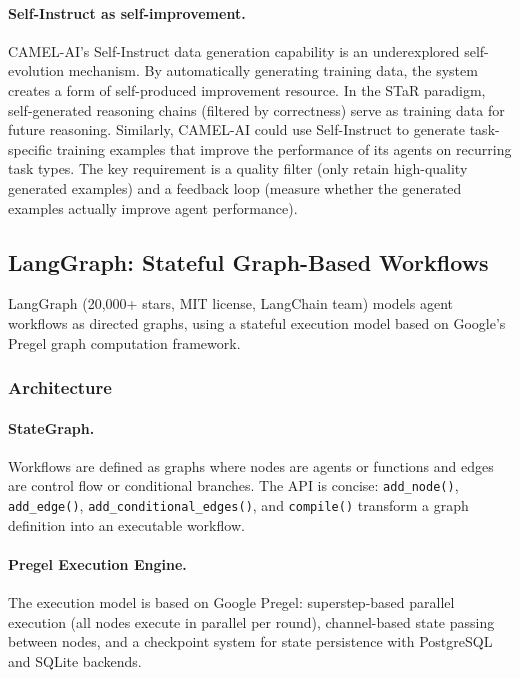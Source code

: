 \paragraph{Self-Instruct as self-improvement.}
CAMEL-AI's Self-Instruct data generation capability is an underexplored self-evolution mechanism. By automatically generating training data, the system creates a form of self-produced improvement resource. In the STaR paradigm, self-generated reasoning chains (filtered by correctness) serve as training data for future reasoning. Similarly, CAMEL-AI could use Self-Instruct to generate task-specific training examples that improve the performance of its agents on recurring task types. The key requirement is a quality filter (only retain high-quality generated examples) and a feedback loop (measure whether the generated examples actually improve agent performance).


\subsection{LangGraph: Stateful Graph-Based Workflows}

LangGraph (20,000+ stars, MIT license, LangChain team) models agent workflows as directed graphs, using a stateful execution model based on Google's Pregel graph computation framework.

\subsubsection{Architecture}

\paragraph{StateGraph.}
Workflows are defined as graphs where nodes are agents or functions and edges are control flow or conditional branches. The API is concise: \texttt{add\_node()}, \texttt{add\_edge()}, \texttt{add\_conditional\_edges()}, and \texttt{compile()} transform a graph definition into an executable workflow.

\paragraph{Pregel Execution Engine.}
The execution model is based on Google Pregel: superstep-based parallel execution (all nodes execute in parallel per round), channel-based state passing between nodes, and a checkpoint system for state persistence with PostgreSQL and SQLite backends.


